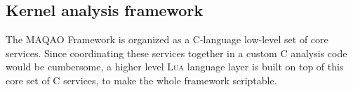 \documentclass[11pt, a4paper, twoside]{montblanc2}
\def\lua{\textsc{Lua}\xspace}
\begin{document}
\subsection{Kernel analysis framework}


The MAQAO Framework is organized as a C-language low-level set of core services. 
Since coordinating these services together in a custom C analysis code would be 
cumbersome, a higher level \lua language layer is built on top of this core set 
of C services, to make the whole framework scriptable.
\end{document}
